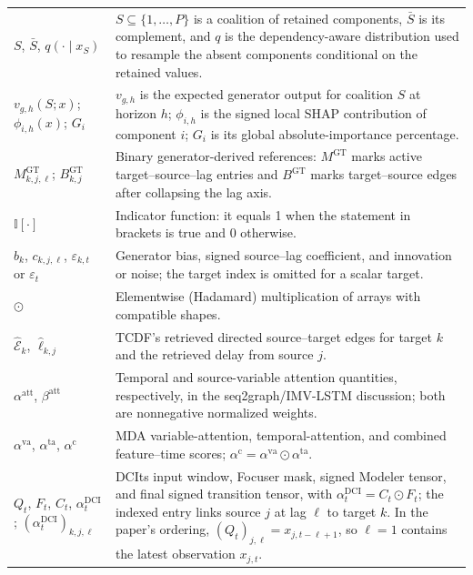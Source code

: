\begin{longtable}{@{}
>{\raggedright\arraybackslash}p{}
>{\raggedright\arraybackslash}p{}@{}}
$S$, $\bar S$, $q(\cdot\mid x_S)$ &
$S\subseteq\{1,\ldots,P\}$ is a coalition of retained components, $\bar S$ is
its complement, and $q$ is the dependency-aware distribution used to resample
the absent components conditional on the retained values. \\

$v_{g,h}(S;x)$; $\phi_{i,h}(x)$; $G_i$ &
$v_{g,h}$ is the expected generator output for coalition $S$ at horizon $h$;
$\phi_{i,h}$ is the signed local SHAP contribution of component $i$; $G_i$ is
its global absolute-importance percentage. \\

$M^{\mathrm{GT}}_{k,j,\ell}$; $B^{\mathrm{GT}}_{k,j}$ &
Binary generator-derived references: $M^{\mathrm{GT}}$ marks active
target--source--lag entries and $B^{\mathrm{GT}}$ marks target--source edges
after collapsing the lag axis. \\

$\mathbb{I}[\cdot]$ &
Indicator function: it equals 1 when the statement in brackets is true and 0
otherwise. \\

$b_k$, $c_{k,j,\ell}$, $\varepsilon_{k,t}$ or $\varepsilon_t$ &
Generator bias, signed source--lag coefficient, and innovation or noise; the
target index is omitted for a scalar target. \\

$\odot$ &
Elementwise (Hadamard) multiplication of arrays with compatible shapes. \\

$\widehat{\mathcal E}_k$, $\widehat\ell_{k,j}$ &
TCDF's retrieved directed source--target edges for target $k$ and the retrieved
delay from source $j$. \\

$\alpha^{\mathrm{att}}$, $\beta^{\mathrm{att}}$ &
Temporal and source-variable attention quantities, respectively, in the
seq2graph/IMV-LSTM discussion; both are nonnegative normalized weights. \\

$\alpha^{\mathrm{va}}$, $\alpha^{\mathrm{ta}}$,
$\alpha^{\mathrm{c}}$ &
MDA variable-attention, temporal-attention, and combined feature--time scores;
$\alpha^{\mathrm{c}}=\alpha^{\mathrm{va}}\odot\alpha^{\mathrm{ta}}$. \\

$Q_t$, $F_t$, $C_t$, $\alpha^{\mathrm{DCI}}_t$;
$(\alpha^{\mathrm{DCI}}_t)_{k,j,\ell}$ &
DCIts input window, Focuser mask, signed Modeler tensor, and final signed
transition tensor, with $\alpha^{\mathrm{DCI}}_t=C_t\odot F_t$; the indexed
entry links source $j$ at lag $\ell$ to target $k$. In the paper's ordering,
$(Q_t)_{j,\ell}=x_{j,t-\ell+1}$, so $\ell=1$ contains the latest observation
$x_{j,t}$. \\


\end{longtable}
